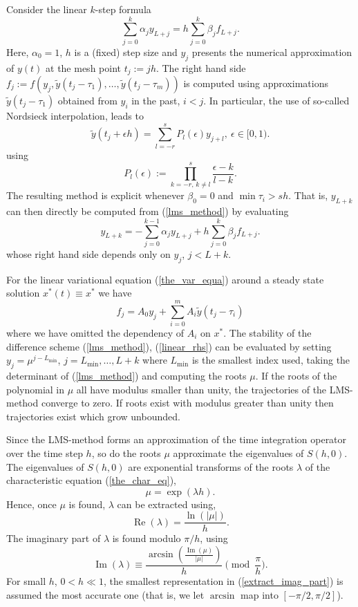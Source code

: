 \documentclass[10pt]{scrartcl}
\renewcommand{\Re}{\operatorname{Re}}
\renewcommand{\Im}{\operatorname{Im}}
\newcommand{\defeq}{:=}
\begin{document}
{Consider the linear $k$-step formula
\begin{equation}\label{lms_method}
\sum_{j=0}^k\alpha_j y_{L+j}=h\sum_{j=0}^k\beta_j f_{L+j}.
\end{equation}
Here, $\alpha_0=1$, $h$ is a (fixed) step size and 
$y_j$ presents the numerical approximation of $y(t)$ at the mesh
point $t_j\defeq jh$.
The right hand side
$f_j\defeq f(y_j,\tilde{y}(t_j-\tau_1),\ldots,\tilde{y}(t_j-\tau_m))$ 
is computed using approximations $\tilde{y}(t_j-\tau_1)$ 
obtained from $y_i$ in the past, $i<j$.
In particular, the use of so-called Nordsieck interpolation, leads to
\begin{equation}\label{past_terms}
\tilde{y}(t_j+\epsilon h)=\sum_{l=-r}^s P_l(\epsilon)y_{j+l},\ \epsilon \in [0,1).
\end{equation}
using
\[
P_l(\epsilon)\defeq\prod_{k=-r,\,k\neq l}^s\frac{\epsilon-k}{l-k}.
\]
The resulting method is explicit whenever $\beta_0=0$ and 
$\min{\tau_i}>sh$.
That is, $y_{L+k}$ can then directly be computed from (\ref{lms_method})
by evaluating
\[
y_{L+k}=-\sum_{j=0}^{k-1}\alpha_j y_{L+j}+h\sum_{j=0}^k\beta_j f_{L+j}.
\]
whose right hand side depends only on $y_j$, $j<L+k$.

For the linear variational equation (\ref{the_var_equa})
around a steady state solution $x^*(t)\equiv x^*$
we have
\begin{equation}\label{linear_rhs}
f_j=A_0y_j+\sum_{i=0}^mA_i\tilde{y}(t_j-\tau_i)
\end{equation}
where we have omitted the dependency of $A_i$ on $x^*$.
The stability of the difference scheme (\ref{lms_method}), (\ref{linear_rhs})
can be evaluated by setting $y_j=\mu^{j-L_{\min}}$, $j=L_{\min},\ldots,L+k$ 
where $L_{\min}$ is the 
smallest index used, taking the determinant of (\ref{lms_method})
and computing the roots $\mu$. If the roots of the
polynomial in $\mu$ all have modulus smaller than unity, the trajectories
of the LMS-method converge to zero. 
If roots exist with modulus greater than unity then trajectories exist
which grow unbounded.

Since the LMS-method forms an approximation of
the time integration operator over the time step $h$, so do the 
roots $\mu$ approximate the eigenvalues of $S(h,0)$.
The eigenvalues of $S(h,0)$ are exponential transforms of
the roots $\lambda$ of the characteristic 
equation (\ref{the_char_eq}),
\[
\mu=\exp(\lambda h).
\]
Hence, once $\mu$ is found, $\lambda$ can be extracted using,
\begin{equation}\label{extract_real_part}
\Re(\lambda)=\frac{\ln(|\mu|)}{h}.
\end{equation}
The imaginary part of $\lambda$ is found modulo $\pi/h$, using
\begin{equation}\label{extract_imag_part}
\Im(\lambda)\equiv\frac{\arcsin(\frac{\Im(\mu)}{|\mu|})}
{h}\!\!\!\!\pmod{\frac{\pi}{h}}.
\end{equation}
For small $h$, $0<h\ll 1$, the smallest representation 
in (\ref{extract_imag_part})
is assumed the most accurate one (that is, we let $\arcsin$
map into $[-\pi/2,\pi/2]$).

}
\end{document}
